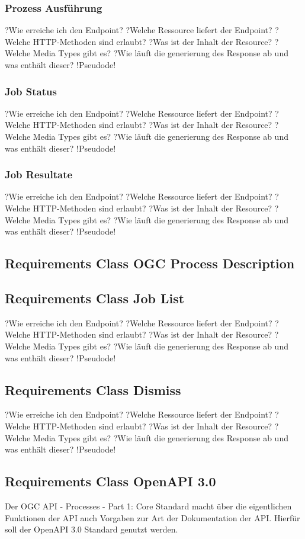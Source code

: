 \subsubsection{Prozess Ausführung}
?Wie erreiche ich den Endpoint?
?Welche Ressource liefert der Endpoint?
?Welche HTTP-Methoden sind erlaubt?
?Was ist der Inhalt der Resource?
?Welche Media Types gibt es?
?Wie läuft die generierung des Response ab und was enthält dieser?
!Pseudode!
\subsubsection{Job Status}?Wie erreiche ich den Endpoint?
?Welche Ressource liefert der Endpoint?
?Welche HTTP-Methoden sind erlaubt?
?Was ist der Inhalt der Resource?
?Welche Media Types gibt es?
?Wie läuft die generierung des Response ab und was enthält dieser?
!Pseudode!
\subsubsection{Job Resultate}
?Wie erreiche ich den Endpoint?
?Welche Ressource liefert der Endpoint?
?Welche HTTP-Methoden sind erlaubt?
?Was ist der Inhalt der Resource?
?Welche Media Types gibt es?
?Wie läuft die generierung des Response ab und was enthält dieser?
!Pseudode!
\subsection{Requirements Class OGC Process Description}
\subsection{Requirements Class Job List}
?Wie erreiche ich den Endpoint?
?Welche Ressource liefert der Endpoint?
?Welche HTTP-Methoden sind erlaubt?
?Was ist der Inhalt der Resource?
?Welche Media Types gibt es?
?Wie läuft die generierung des Response ab und was enthält dieser?
!Pseudode!
\subsection{Requirements Class Dismiss}
?Wie erreiche ich den Endpoint?
?Welche Ressource liefert der Endpoint?
?Welche HTTP-Methoden sind erlaubt?
?Was ist der Inhalt der Resource?
?Welche Media Types gibt es?
?Wie läuft die generierung des Response ab und was enthält dieser?
!Pseudode!
\subsection{Requirements Class OpenAPI 3.0}
Der OGC API - Processes - Part 1: Core Standard macht über die eigentlichen Funktionen der API auch Vorgaben zur Art der Dokumentation der API. Hierfür soll der 
OpenAPI 3.0 Standard genutzt werden. 
